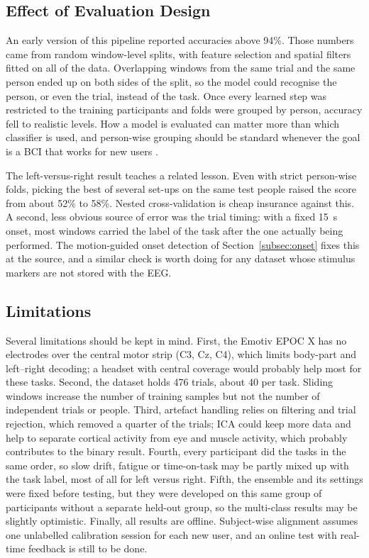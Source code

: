 \documentclass[pdflatex,sn-mathphys-num]{sn-jnl}%
\theoremstyle{thmstyleone}%
\theoremstyle{thmstyletwo}%
\theoremstyle{thmstylethree}%
\begin{document}
\subsection{Effect of Evaluation Design}\label{subsec:design}

An early version of this pipeline reported accuracies above 94\%. Those numbers came from random window-level splits, with feature selection and spatial filters fitted on all of the data. Overlapping windows from the same trial and the same person ended up on both sides of the split, so the model could recognise the person, or even the trial, instead of the task. Once every learned step was restricted to the training participants and folds were grouped by person, accuracy fell to realistic levels. How a model is evaluated can matter more than which classifier is used, and person-wise grouping should be standard whenever the goal is a BCI that works for new users \citep{Lotte2018}.

The left-versus-right result teaches a related lesson. Even with strict person-wise folds, picking the best of several set-ups on the same test people raised the score from about 52\% to 58\%. Nested cross-validation is cheap insurance against this. A second, less obvious source of error was the trial timing: with a fixed 15~s onset, most windows carried the label of the task after the one actually being performed. The motion-guided onset detection of Section~\ref{subsec:onset} fixes this at the source, and a similar check is worth doing for any dataset whose stimulus markers are not stored with the EEG.

\subsection{Limitations}\label{subsec:limits}

Several limitations should be kept in mind. First, the Emotiv EPOC X has no electrodes over the central motor strip (C3, Cz, C4), which limits body-part and left--right decoding; a headset with central coverage would probably help most for these tasks. Second, the dataset holds 476 trials, about 40 per task. Sliding windows increase the number of training samples but not the number of independent trials or people. Third, artefact handling relies on filtering and trial rejection, which removed a quarter of the trials; ICA could keep more data and help to separate cortical activity from eye and muscle activity, which probably contributes to the binary result. Fourth, every participant did the tasks in the same order, so slow drift, fatigue or time-on-task may be partly mixed up with the task label, most of all for left versus right. Fifth, the ensemble and its settings were fixed before testing, but they were developed on this same group of participants without a separate held-out group, so the multi-class results may be slightly optimistic. Finally, all results are offline. Subject-wise alignment assumes one unlabelled calibration session for each new user, and an online test with real-time feedback is still to be done.
\end{document}
